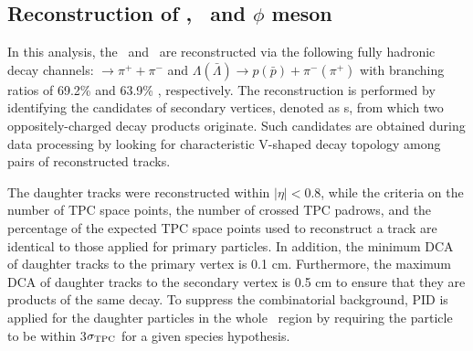 \documentclass[ALICE,manyauthors]{cernphprep}
\begin{document}
\subsection{Reconstruction of \Ks, \lambdas~and $\phi$ meson}
\label{SubSec:K0sLambdaPhiRec}



In this analysis, the \Ks~and \lambdas~are reconstructed via the following fully hadronic decay channels: \Ks $\rightarrow \pi^{+} + \pi^{-}$ and  $\Lambda(\bar{\Lambda})\rightarrow p(\bar{p})+\pi^{-}(\pi^{+})$ with branching ratios of 69.2\% and 63.9\% \cite{Olive_2016}, respectively. The reconstruction is performed by identifying the candidates of secondary vertices, denoted as \vo s, from which two oppositely-charged decay products originate. Such candidates are obtained during data processing by looking for characteristic V-shaped decay topology among pairs of reconstructed tracks.

The daughter tracks were reconstructed within $|\eta|<0.8$, while the criteria on the number of TPC space points, the number of crossed TPC padrows, and the percentage of the expected TPC space points used to reconstruct a track are identical to those applied for primary particles. In addition, the minimum DCA of daughter tracks to the primary vertex is 0.1 cm. Furthermore, the maximum DCA of daughter tracks to the secondary vertex is 0.5 cm to ensure that they are products of the same decay. To suppress the combinatorial background, PID is applied for the daughter particles in the whole \pT~region by requiring the particle to be within 3$\sigma_{\rm TPC}$ for a given species hypothesis.
\end{document}
